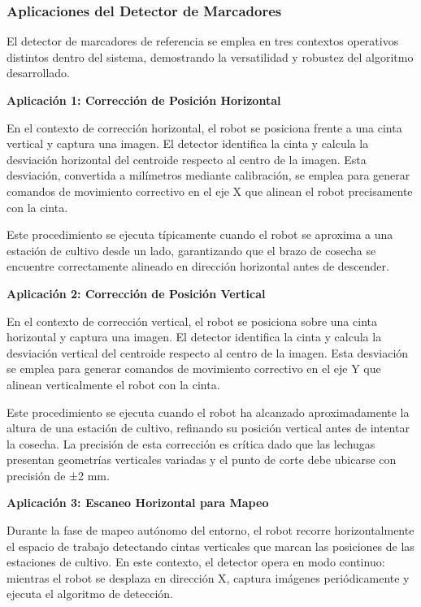 \subsubsection{Aplicaciones del Detector de Marcadores}

El detector de marcadores de referencia se emplea en tres contextos operativos distintos dentro del sistema, demostrando la versatilidad y robustez del algoritmo desarrollado.

\textbf{Aplicación 1: Corrección de Posición Horizontal}

En el contexto de corrección horizontal, el robot se posiciona frente a una cinta vertical y captura una imagen. El detector identifica la cinta y calcula la desviación horizontal del centroide respecto al centro de la imagen. Esta desviación, convertida a milímetros mediante calibración, se emplea para generar comandos de movimiento correctivo en el eje X que alinean el robot precisamente con la cinta.

Este procedimiento se ejecuta típicamente cuando el robot se aproxima a una estación de cultivo desde un lado, garantizando que el brazo de cosecha se encuentre correctamente alineado en dirección horizontal antes de descender.

\textbf{Aplicación 2: Corrección de Posición Vertical}

En el contexto de corrección vertical, el robot se posiciona sobre una cinta horizontal y captura una imagen. El detector identifica la cinta y calcula la desviación vertical del centroide respecto al centro de la imagen. Esta desviación se emplea para generar comandos de movimiento correctivo en el eje Y que alinean verticalmente el robot con la cinta.

Este procedimiento se ejecuta cuando el robot ha alcanzado aproximadamente la altura de una estación de cultivo, refinando su posición vertical antes de intentar la cosecha. La precisión de esta corrección es crítica dado que las lechugas presentan geometrías verticales variadas y el punto de corte debe ubicarse con precisión de ±2 mm.

\textbf{Aplicación 3: Escaneo Horizontal para Mapeo}

Durante la fase de mapeo autónomo del entorno, el robot recorre horizontalmente el espacio de trabajo detectando cintas verticales que marcan las posiciones de las estaciones de cultivo. En este contexto, el detector opera en modo continuo: mientras el robot se desplaza en dirección X, captura imágenes periódicamente y ejecuta el algoritmo de detección.

